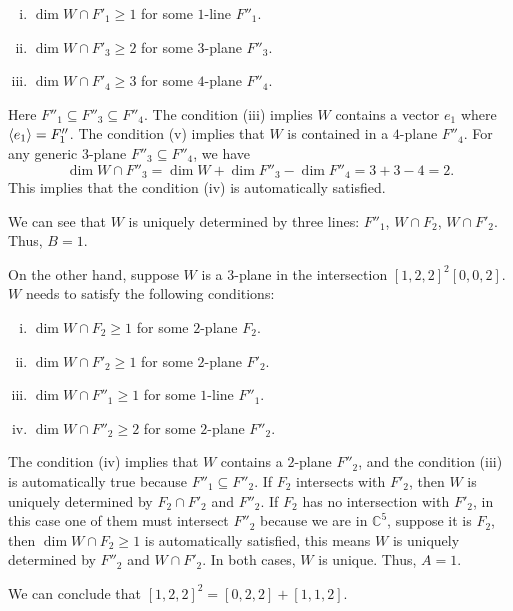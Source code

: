 \documentclass[letterpaper, 12pt]{article}
\begin{document}
\begin{solution}
\begin{enumerate}[(1)]
\begin{enumerate}[(i)]
\item \(\dim W\cap F'_1\geq 1\) for some \(1\)-line \(F''_1\).
\item \(\dim W\cap F'_3\geq 2\) for some \(3\)-plane \(F''_3\).
\item \(\dim W\cap F'_4\geq 3\) for some \(4\)-plane \(F''_4\).
\end{enumerate}
Here \(F''_1\subseteq F''_3\subseteq F''_4\). The condition (iii) implies \(W\) contains a vector \(e_1\) where \(\langle e_1\rangle=F''_1\).  The condition (v) implies that \(W\) is contained in a \(4\)-plane \(F''_4\). For any generic \(3\)-plane \(F''_3\subseteq F''_4\), we have 
\[\dim W\cap F''_3=\dim W+\dim F''_3-\dim F''_4=3+3-4=2.\]
This implies that the condition (iv) is automatically satisfied. 
\end{enumerate}
We can see that \(W\) is uniquely determined by three lines: \(F''_1\), \(W\cap F_2\), \(W\cap F'_2\). Thus, \(B=1\). 

On the other hand, suppose \(W\) is a \(3\)-plane in the intersection \([1,2,2]^2[0,0,2]\). \(W\) needs to satisfy the following conditions:
\begin{enumerate}[(i)]
\item \(\dim W\cap F_2\geq 1\) for some \(2\)-plane \(F_2\). 
\item \(\dim W\cap F'_2\geq 1\) for some \(2\)-plane \(F'_2\).
\item \(\dim W\cap F''_1\geq 1\) for some \(1\)-line \(F''_1\).
\item \(\dim W\cap F''_2\geq 2\) for some \(2\)-plane \(F''_2\). 
\end{enumerate}
The condition (iv) implies that \(W\) contains a \(2\)-plane \(F''_2\), and the condition (iii) is automatically true because \(F''_1\subseteq F''_2\). If \(F_2\) intersects with \(F'_2\), then \(W\) is uniquely determined by \(F_2\cap F'_2\) and \(F''_2\). If \(F_2\) has no intersection with \(F'_2\), in this case one of them must intersect \(F''_2\) because we are in \(\mathbb{C}^5\), suppose it is \(F_2\), then \(\dim W\cap F_2\geq 1\) is automatically satisfied, this means \(W\) is uniquely determined by \(F''_2\) and \(W\cap F'_2\). In both cases, \(W\) is unique. Thus, \(A=1\).

We can conclude that \([1,2,2]^2=[0,2,2]+[1,1,2]\).

\end{solution}
\end{document}
